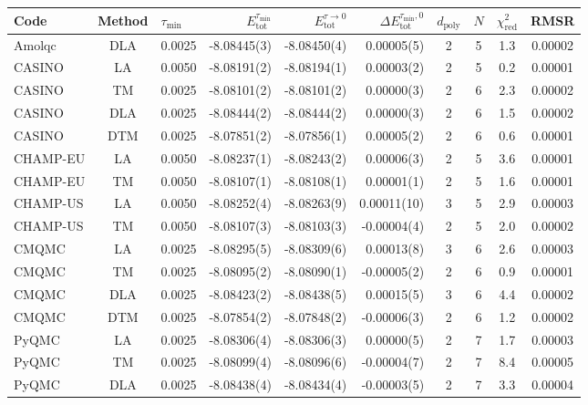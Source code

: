 \begin{tabular}{|lc|lr|r|r|cccc|}
\toprule
Code & Method & $\tau_\text{min}$ & $E_\text{tot}^{\tau_\text{min}}$ & $E_\text{tot}^{\tau\to 0}$ & $\Delta E_\text{tot}^{\tau_\text{min},0}$ & $d_\text{poly}$ & $N$ & $\chi^2_\textrm{red}$ & RMSR \\
\midrule
Amolqc           &  DLA  & 0.0025 & -8.08445(3) & -8.08450(4) & 0.00005(5) & 2 & 5 & 1.3 & 0.00002 \\
CASINO           &  LA   & 0.0050 & -8.08191(2) & -8.08194(1) & 0.00003(2) & 2 & 5 & 0.2 & 0.00001 \\
CASINO           &  TM   & 0.0025 & -8.08101(2) & -8.08101(2) & 0.00000(3) & 2 & 6 & 2.3 & 0.00002 \\
CASINO           &  DLA  & 0.0025 & -8.08444(2) & -8.08444(2) & 0.00000(3) & 2 & 6 & 1.5 & 0.00002 \\
CASINO           &  DTM  & 0.0025 & -8.07851(2) & -8.07856(1) & 0.00005(2) & 2 & 6 & 0.6 & 0.00001 \\
CHAMP-EU         &  LA   & 0.0050 & -8.08237(1) & -8.08243(2) & 0.00006(3) & 2 & 5 & 3.6 & 0.00001 \\
CHAMP-EU         &  TM   & 0.0050 & -8.08107(1) & -8.08108(1) & 0.00001(1) & 2 & 5 & 1.6 & 0.00001 \\
CHAMP-US         &  LA   & 0.0050 & -8.08252(4) & -8.08263(9) & 0.00011(10) & 3 & 5 & 2.9 & 0.00003 \\
CHAMP-US         &  TM   & 0.0050 & -8.08107(3) & -8.08103(3) & -0.00004(4) & 2 & 5 & 2.0 & 0.00002 \\
CMQMC            &  LA   & 0.0025 & -8.08295(5) & -8.08309(6) & 0.00013(8) & 3 & 6 & 2.6 & 0.00003 \\
CMQMC            &  TM   & 0.0025 & -8.08095(2) & -8.08090(1) & -0.00005(2) & 2 & 6 & 0.9 & 0.00001 \\
CMQMC            &  DLA  & 0.0025 & -8.08423(2) & -8.08438(5) & 0.00015(5) & 3 & 6 & 4.4 & 0.00002 \\
CMQMC            &  DTM  & 0.0025 & -8.07854(2) & -8.07848(2) & -0.00006(3) & 2 & 6 & 1.2 & 0.00002 \\
PyQMC            &  LA   & 0.0025 & -8.08306(4) & -8.08306(3) & 0.00000(5) & 2 & 7 & 1.7 & 0.00003 \\
PyQMC            &  TM   & 0.0025 & -8.08099(4) & -8.08096(6) & -0.00004(7) & 2 & 7 & 8.4 & 0.00005 \\
PyQMC            &  DLA  & 0.0025 & -8.08438(4) & -8.08434(4) & -0.00003(5) & 2 & 7 & 3.3 & 0.00004 \\

\end{tabular}
